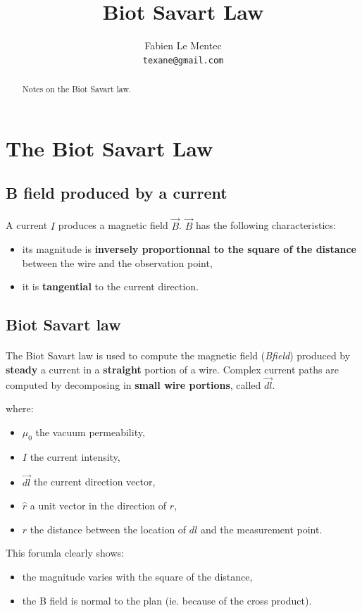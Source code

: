 \documentclass[12pt]{article}
\title{Biot Savart Law}
\author{Fabien Le Mentec\\
\small \texttt{texane@gmail.com}
}
\date{}
\begin{document}
\maketitle

\newpage
\begin{abstract}
Notes on the Biot Savart law.
\end{abstract}

\newpage
\section{The Biot Savart Law}

\subsection{B field produced by a current}
\paragraph{} A current $I$ produces a magnetic field $\vec{B}$. $\vec{B}$ has the following characteristics:
\begin{itemize}
  \item its magnitude is \textbf{inversely proportionnal to the square of the distance} between the
    wire and the observation point,
  \item it is \textbf{tangential} to the current direction.
\end{itemize}

\subsection{Biot Savart law}
\paragraph{} The Biot Savart law is used to compute the magnetic field (\textit{Bfield}) produced by
\textbf{steady} a current in a \textbf{straight} portion of a wire. Complex current paths are computed
by decomposing in \textbf{small wire portions}, called $\vec{dl}$.
\begin{center}
\end{center}
where:
\begin{itemize}
\item $\mu_{0}$ the vacuum permeability,
\item $I$ the current intensity,
\item $\vec{dl}$ the current direction vector,
\item $\hat{r}$ a unit vector in the direction of $r$,
\item $r$ the distance between the location of $dl$ and the measurement point.
\end{itemize}
This forumla clearly shows:
\begin{itemize}
  \item the magnitude varies with the square of the distance,
  \item the B field is normal to the plan (ie. because of the cross product).
\end{itemize}
\end{document}

